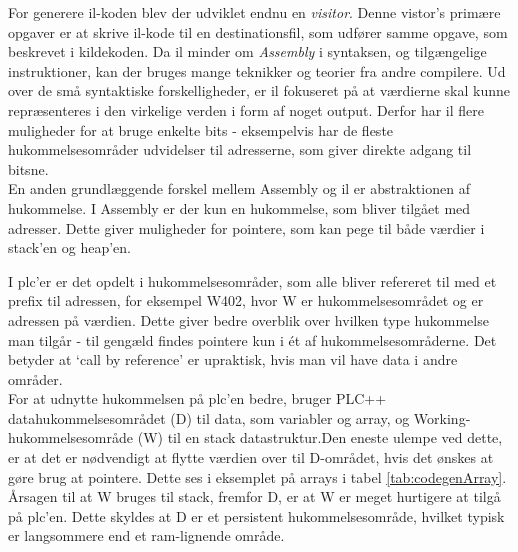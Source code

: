 \noindent For generere \gls{il}-koden blev der udviklet endnu en \textit{visitor}. Denne vistor's primære opgaver er at skrive \gls{il}-kode til en destinationsfil, som udfører samme opgave, som beskrevet i kildekoden. Da \gls{il} minder om \textit{Assembly} i syntaksen, og tilgængelige instruktioner, kan der bruges mange teknikker og teorier fra andre compilere. Ud over de små syntaktiske forskelligheder, er \gls{il} fokuseret på at værdierne skal kunne repræsenteres i den virkelige verden i form af noget output. Derfor har \gls{il} flere muligheder for at bruge enkelte bits - eksempelvis har de fleste hukommelsesområder udvidelser til adresserne, som giver direkte adgang til bitsne. \\

\noindent En anden grundlæggende forskel mellem Assembly og \gls{il} er abstraktionen af hukommelse. I Assembly er der kun en hukommelse, som bliver tilgået med adresser. Dette giver muligheder for pointere, som kan pege til både værdier i stack'en og heap'en.

\noindent I \gls{plc}'er er det opdelt i hukommelsesområder, som alle bliver refereret til med et prefix til adressen, for eksempel {\ttfamily W402}, hvor {\ttfamily W} er hukommelsesområdet og {} er adressen på værdien. Dette giver bedre overblik over hvilken type hukommelse man tilgår - til gengæld findes pointere kun i ét af hukommelsesområderne. Det betyder at \enquote*{call by reference} er upraktisk, hvis man vil have data i andre områder.\\

\noindent For at udnytte hukommelsen på \gls{plc}'en bedre, bruger PLC++ datahukommelsesområdet ({\ttfamily D}) til data, som variabler og array, og Working-hukommelsesområde ({\ttfamily W}) til en stack datastruktur.Den eneste ulempe ved dette, er at det er nødvendigt at flytte værdien over til {\ttfamily D}-området, hvis det ønskes at gøre brug at pointere. Dette ses i eksemplet på arrays i tabel \ref{tab:codegenArray}. Årsagen til at {\ttfamily W} bruges til stack, fremfor {\ttfamily D}, er at {\ttfamily W} er meget hurtigere at tilgå på \gls{plc}'en. Dette skyldes at {\ttfamily D} er et persistent hukommelsesområde, hvilket typisk er langsommere end et ram-lignende område.